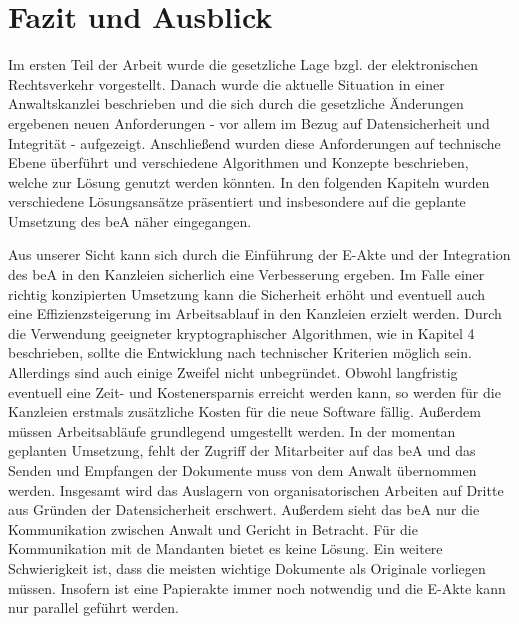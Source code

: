 \section{Fazit und Ausblick}
Im ersten Teil der Arbeit wurde die gesetzliche Lage bzgl. der elektronischen Rechtsverkehr vorgestellt. Danach wurde die aktuelle Situation in einer Anwaltskanzlei beschrieben und die sich durch die gesetzliche Änderungen ergebenen neuen Anforderungen - vor allem im Bezug auf Datensicherheit und Integrität - aufgezeigt. Anschließend wurden diese Anforderungen auf technische Ebene überführt und verschiedene Algorithmen und Konzepte beschrieben, welche zur Lösung genutzt werden könnten. In den folgenden Kapiteln wurden verschiedene Lösungsansätze präsentiert und insbesondere auf die geplante Umsetzung des beA näher eingegangen.

Aus unserer Sicht kann sich durch die Einführung der E-Akte und der Integration des beA in den Kanzleien sicherlich eine Verbesserung ergeben. Im Falle einer richtig konzipierten Umsetzung kann die Sicherheit erhöht und eventuell auch eine Effizienzsteigerung im Arbeitsablauf in den Kanzleien erzielt werden. Durch die Verwendung geeigneter kryptographischer Algorithmen, wie in Kapitel 4 beschrieben, sollte die Entwicklung nach technischer Kriterien möglich sein. Allerdings sind auch einige Zweifel nicht unbegründet. Obwohl langfristig eventuell eine Zeit-  und Kostenersparnis erreicht werden kann, so werden für die Kanzleien erstmals zusätzliche Kosten für die neue Software fällig. Außerdem müssen Arbeitsabläufe grundlegend  umgestellt werden. In der momentan geplanten Umsetzung, fehlt der Zugriff der Mitarbeiter auf das beA und das Senden und Empfangen der Dokumente muss von dem Anwalt übernommen werden. Insgesamt wird das Auslagern von organisatorischen Arbeiten auf Dritte aus Gründen der Datensicherheit erschwert. Außerdem sieht das beA nur die Kommunikation zwischen Anwalt und Gericht in Betracht. Für die Kommunikation mit de Mandanten bietet es keine Lösung.  
Ein weitere Schwierigkeit ist, dass die meisten wichtige Dokumente als Originale vorliegen müssen. Insofern ist eine Papierakte immer noch notwendig und die E-Akte kann nur parallel geführt werden.
     